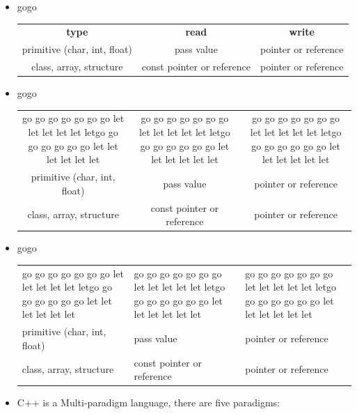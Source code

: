 \documentclass[a4paper,11pt,twoside]{book}
\newcommand{\tophline}{ }
\newcommand{\bottomhline}{ }
\begin{document}
\begin{itemize}

\item gogo 

	
\begin{tabular}{|c|c|c|}

	\textbf{type} & \textbf{read} & \textbf{write} \\

	primitive (char, int, float) & pass value & pointer or reference \\

	class, array, structure  & const pointer or reference &  pointer or reference  
\end{tabular}
\item gogo \newline

\begin{tabular}{|c|c|c|}
	
	go go go go go go go let let let let let letgo go go go go go go let let let let let let &  go go go go go go go let let let let let letgo go go go go go go let let let let let let&
	go go go go go go go let let let let let letgo go go go go go go let let let let let let  \\
	
	primitive (char, int, float) & pass value & pointer or reference \\
	
	class, array, structure  & const pointer or reference &  pointer or reference  
\end{tabular}

\item gogo 

\begin{tabular}{|p{}|p{}|p{}|}
	\tophline
	go go go go go go go let let let let let letgo go go go go go go let let let let let let &  go go go go go go go let let let let let letgo go go go go go go let let let let let let&
	go go go go go go go let let let let let letgo go go go go go go let let let let let let  
	\\ \tophline
	
	primitive (char, int, float) & pass value & pointer or reference \\ \tophline
	class, array, structure  & const pointer or reference &  pointer or reference \bottomhline
\end{tabular}


    \item C++ is a Multi-paradigm language, there are five paradigms: 
    

\end{itemize}
\end{document}
